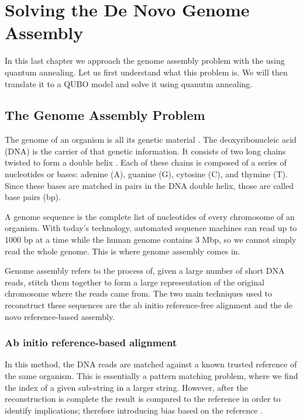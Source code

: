 \chapter{Solving the De Novo Genome Assembly}


In this last chapter we approach the genome assembly problem with the using quantum annealing. Let us first understand what this problem is. We will then translate it to a QUBO model and solve it using quanutm annealing.


\section{The Genome Assembly Problem}


The genome of an organism is all its genetic material \cite{Roth2019}. The deoxyribonucleic acid (DNA) is the carrier of that genetic information. It consists of two long chains twisted to form a double helix \cite{Alberts2007}. Each of these chains is composed of a series of nucleotides or bases: adenine (A), guanine (G), cytosine (C), and thymine (T). Since these bases are matched in pairs in the DNA double helix, those are called base pairs (bp).

A genome sequence is the complete list of nucleotides of every chromosome of an organism. With today's technology, automated sequence machines can read up to 1000 bp at a time \cite{Slatko2011} while the human genome contains 3 Mbp, so we cannot simply read the whole genome. This is where genome assembly comes in.

Genome assembly refers to the process of, given a large number of short DNA reads, stitch them together to form a large representation of the original chromosome where the reads came from. The two main techniques used to reconstruct these sequences are the ab initio reference-free alignment and the de novo reference-based assembly.


\subsection{Ab initio reference-based alignment}


In this method, the DNA reads are matched against a known trusted reference of the same organism. This is essentially a pattern matching problem, where we find the index of a given sub-string in a larger string. However, after the reconstruction is complete the result is compared to the reference in order to identify implications; therefore introducing bias based on the reference \cite{Sarkar2020}.

